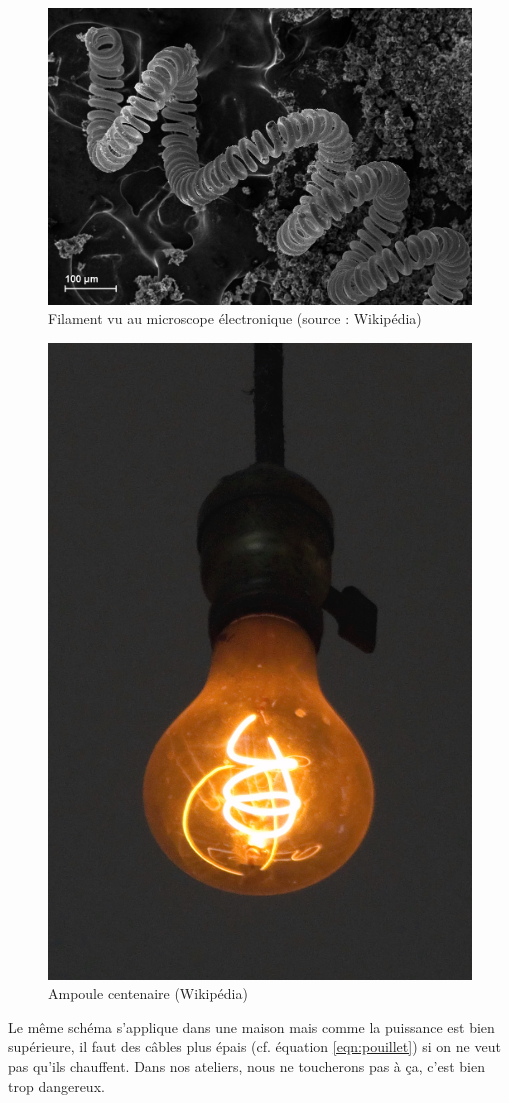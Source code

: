\documentclass[11pt,a4paper,oneside,twocolumn]{article}
\begin{document}
\begin{figure}[ht]
	\centering
	\includegraphics[width=\linewidth]{w.jpg}
	\caption{Filament vu au microscope électronique (source : Wikipédia)}
	\label{fig:micro}
\end{figure}

\begin{figure}[ht]
	\centering
	\includegraphics[width=0.5\linewidth]{centenaire.jpg}
	\caption{Ampoule centenaire (Wikipédia)}
	\label{fig:w}
\end{figure}

Le même schéma s'applique dans une maison mais comme la puissance est bien
supérieure, il faut des câbles plus épais (cf. équation \ref{eqn:pouillet}) si
on ne veut pas qu'ils chauffent.
Dans nos ateliers, nous ne toucherons pas à ça, c'est bien trop dangereux.
\end{document}
